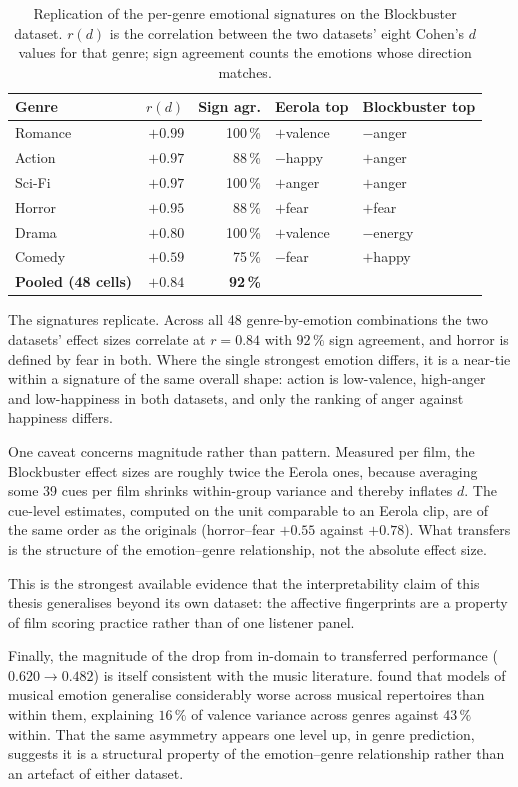 \begin{table}[t]
  \centering
  \caption{Replication of the per-genre emotional signatures on the Blockbuster dataset.
    $r(d)$ is the correlation between the two datasets' eight Cohen's $d$ values for that
    genre; sign agreement counts the emotions whose direction matches.}
  \label{tab:signature_replication}
  \begin{tabular}{lrrll}
    \hline
    Genre & $r(d)$ & Sign agr. & Eerola top & Blockbuster top \\
    \hline
    Romance & $+0.99$ & 100\,\% & $+$valence & $-$anger \\
    Action  & $+0.97$ &  88\,\% & $-$happy   & $+$anger \\
    Sci-Fi  & $+0.97$ & 100\,\% & $+$anger   & $+$anger \\
    Horror  & $+0.95$ &  88\,\% & $+$fear    & $+$fear \\
    Drama   & $+0.80$ & 100\,\% & $+$valence & $-$energy \\
    Comedy  & $+0.59$ &  75\,\% & $-$fear    & $+$happy \\
    \hline
    \textbf{Pooled (48 cells)} & $\mathbf{+0.84}$ & \textbf{92\,\%} & & \\
    \hline
  \end{tabular}
\end{table}

The signatures replicate. Across all 48 genre-by-emotion combinations the two datasets'
effect sizes correlate at $r = 0.84$ with $92\,\%$ sign agreement, and horror is defined by
fear in both. Where the single strongest emotion differs, it is a near-tie within a
signature of the same overall shape: action is low-valence, high-anger and low-happiness in
both datasets, and only the ranking of anger against happiness differs.

One caveat concerns magnitude rather than pattern. Measured per film, the Blockbuster
effect sizes are roughly twice the Eerola ones, because averaging some 39 cues per film
shrinks within-group variance and thereby inflates $d$. The cue-level estimates, computed
on the unit comparable to an Eerola clip, are of the same order as the originals
(horror--fear $+0.55$ against $+0.78$). What transfers is the structure of the
emotion--genre relationship, not the absolute effect size.

This is the strongest available evidence that the interpretability claim of this thesis
generalises beyond its own dataset: the affective fingerprints are a property of film
scoring practice rather than of one listener panel.

Finally, the magnitude of the drop from in-domain to transferred performance
($0.620 \rightarrow 0.482$) is itself consistent with the music literature.
\citet{eerola2011genrespecific} found that models of musical emotion generalise
considerably worse across musical repertoires than within them, explaining $16\,\%$ of
valence variance across genres against $43\,\%$ within. That the same asymmetry appears
one level up, in genre prediction, suggests it is a structural property of the
emotion--genre relationship rather than an artefact of either dataset.
